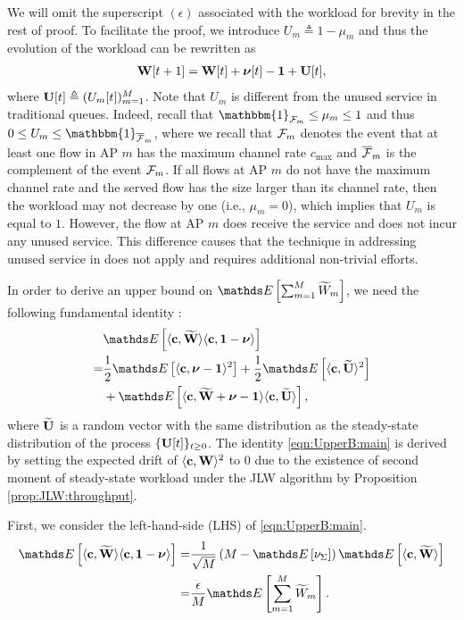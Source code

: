 \documentclass[10pt, conference, letterpaper]{IEEEtran} %
\begin{document}
We will omit the superscript $(\epsilon)$ associated with the workload for brevity in the rest of proof. To facilitate the proof, we introduce $U_m\triangleq 1-\mu_m$ and thus the evolution of the workload can be rewritten as  
\begin{align}
\label{eqn:UpperB:evolution}
\mathbf{W}[t+1] = \mathbf{W}[t] + \boldsymbol{\nu}[t] - \mathbf{1} + \mathbf{U}[t],
\end{align}
where $\mathbf{U}[t]\triangleq(U_{m}[t])_{m=1}^{M}$. Note that $U_m$ is different from the unused service in traditional queues. Indeed, recall that $\mathbbm{1}_{\mc{F}_m}\leq \mu_{m}\leq1$ and thus $0\leq U_m\leq\mathbbm{1}_{\ol{\mc{F}}_m}$, where we recall that $\mathcal{F}_m$ denotes the event that at least one flow in AP $m$ has the maximum channel rate $c_{\max}$ and $\overline{\mathcal{F}}_m$ is the complement of the event $\mathcal{F}_m$. If all flows at AP $m$ do not have the maximum channel rate and the served flow has the size larger than its channel rate, then the workload may not decrease by one (i.e., $\mu_m=0$), which implies that $U_m$ is equal to $1$. However, the flow at AP $m$ does receive the service and does not incur any unused service. This difference causes that the technique in addressing unused service in \cite{erysri12} does not apply and requires additional non-trivial efforts.

In order to derive an upper bound on $\bE\left[\sum_{m=1}^{M}\wt{W}_m\right]$, we need the following fundamental identity \cite[Lemma 8]{erysri12}:
\begin{align}
\label{eqn:UpperB:main}
&\bE\left[\langle\mb{c},\wt{\mb{W}}\rangle\langle\mb{c},\mb{1}-\bs{\nu}\rangle\right]\nonumber\\
=&\frac{1}{2}\bE\left[\langle\mb{c},\bs{\nu}-\mb{1}\rangle^2\right]+\frac{1}{2}\bE\left[\langle\mb{c},\wt{\mb{U}}\rangle^2\right]\nonumber\\
&+\bE\left[\langle\mb{c},\wt{\mb{W}}+\bs{\nu}-\mb{1}\rangle\langle\mb{c},\wt{\mb{U}}\rangle\right],
\end{align}
where $\widetilde{\mathbf{U}}$ is a random vector with the same distribution as the steady-state distribution of the process $\{\mathbf{U}[t]\}_{t\geq0}$. The identity \eqref{eqn:UpperB:main} is derived by setting the expected drift of $\langle\mathbf{c},\mathbf{W}\rangle^2$ to $0$ due to the existence of second moment of steady-state workload under the JLW algorithm by Proposition \ref{prop:JLW:throughput}.

First, we consider the left-hand-side (LHS) of \eqref{eqn:UpperB:main}.
\begin{align}
\label{eqn:UpperB:LHS}
\bE\left[\langle\mb{c},\wt{\mb{W}}\rangle\langle\mb{c},\mb{1}-\bs{\nu}\rangle\right]=&\frac{1}{\sqrt{M}}\left(M-\bE\left[\nu_{\Sigma}\right]\right)\bE\left[\langle\mb{c},\wt{\mb{W}}\rangle\right]\nonumber\\
=&\frac{\epsilon}{M}\bE\left[\sum_{m=1}^{M}\wt{W}_m\right].
\end{align}
\end{document}

